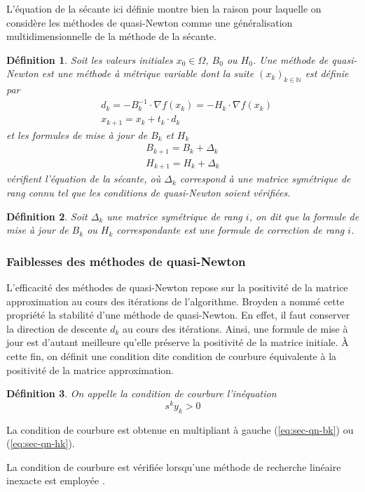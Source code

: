 \documentclass[3p, twocolumn]{elsarticle}
\newtheorem{definition}{Définition}[section]
\begin{document}
\begin{rmk}
    L'équation de la sécante ici définie montre bien la raison pour laquelle on considère les méthodes de quasi-Newton comme une généralisation multidimensionnelle de la méthode de la sécante.
\end{rmk}
\begin{definition}
    Soit les valeurs initiales $x_0\in \Omega$, $B_0$ ou $H_0$. Une méthode de quasi-Newton est une méthode à métrique variable dont la suite $(x_k)_{k\in \mathbb{N}}$ est définie par
    \begin{align*}
         & d_k = -B_k^{-1}\cdot \nabla f(x_k) = -H_k\cdot \nabla f(x_k) \\
         & x_{k+1} = x_k + t_k\cdot d_k
    \end{align*}
    et les formules de mise à jour de $B_k$ et $H_k$
    \begin{align}
        B_{k+1} = B_k + \Delta_k
        \label{eq:maj-bk} \\
        H_{k+1} = H_k + \Delta_k
        \label{eq:maj-hk}
    \end{align}
    vérifient l'équation de la sécante, où $\Delta_k$ correspond à une matrice symétrique de rang connu tel que les conditions de quasi-Newton soient vérifiées.
\end{definition}

\begin{definition}
    Soit $\Delta_k$ une matrice symétrique de rang $i$, on dit que la formule de mise à jour de $B_k$ ou $H_k$ correspondante est une formule de correction de rang $i$.
\end{definition}

\subsubsection{Faiblesses des méthodes de quasi-Newton}
L'efficacité des méthodes de quasi-Newton repose sur la positivité de la matrice approximation au cours des itérations de l'algorithme. Broyden a nommé cette propriété la stabilité d'une méthode de quasi-Newton. En effet, il faut conserver la direction de descente $d_k$ au cours des itérations. Ainsi, une formule de mise à jour est d'autant meilleure qu'elle préserve la positivité de la matrice initiale. \`A cette fin, on définit une condition dite condition de courbure équivalente à la positivité de la matrice approximation.

\begin{definition}
    On appelle la condition de courbure l'inéquation
    \begin{equation}
        s^ky_k > 0
    \end{equation}
\end{definition}
\begin{pf}
    La condition de courbure est obtenue en multipliant à gauche (\ref{eq:sec-qn-bk}) ou (\ref{eq:sec-qn-hk}).
\end{pf}
\begin{rmk}
    La condition de courbure est vérifiée lorsqu'une méthode de recherche linéaire inexacte est employée \cite{poly:mottelet2003}.
\end{rmk}
\end{document}
